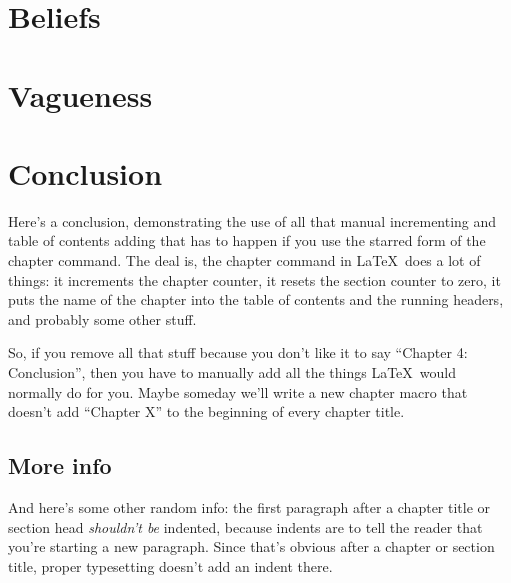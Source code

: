 \documentclass[12pt,twoside]{reedfancy}
\begin{document}
\begin{spacing}{1.25}
\chapter{Beliefs}
\label{brute}



\chapter{Vagueness}
\label{vague}


\chapter{Conclusion}
\label{concl}
	
Here's a conclusion, demonstrating the use of all that manual
incrementing and table of contents adding that has to happen if you
use the starred form of the chapter command.  The deal is, the chapter
command in \LaTeX\ does a lot of things: it increments the chapter
counter, it resets the section counter to zero, it puts the name of
the chapter into the table of contents and the running headers, and
probably some other stuff.

So, if you remove all that stuff because you don't like it to say
``Chapter 4: Conclusion'', then you have to manually add all the
things \LaTeX\ would normally do for you.  Maybe someday we'll write a
new chapter macro that doesn't add ``Chapter X'' to the beginning of
every chapter title.

\section{More info}
And here's some other random info: the first paragraph after a chapter
title or section head \emph{shouldn't be} indented, because indents
are to tell the reader that you're starting a new paragraph.  Since
that's obvious after a chapter or section title, proper typesetting
doesn't add an indent there.





\end{spacing}
\end{document}
